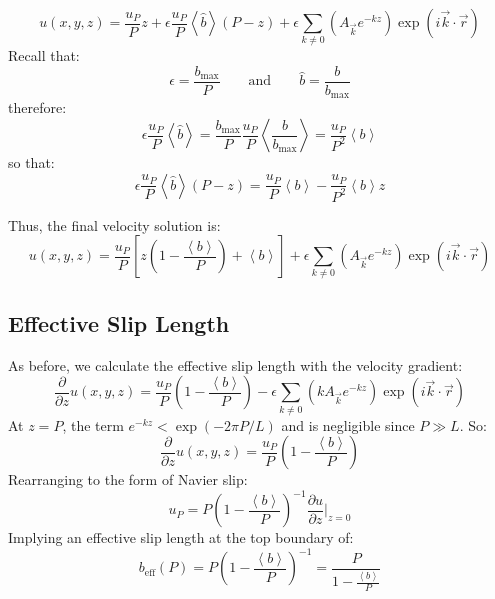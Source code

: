 \documentclass[12pt, a4paper, twoside, openright]{book}
\newcommand{\beff}{\ensuremath{b_{\mathrm{eff}}}}
\newcommand{\bmax}{\ensuremath{b_{\mathrm{max}}}}
\begin{document}
\begin{equation}
u(x,y,z) = \frac{u_P}{P} z
 + \epsilon \frac{u_P}{P} \left< \hat{b} \right> (P - z)
 +  \epsilon \sum_{k \neq 0} 
\left(  A_{\vec{k}} e^{-kz} \right)
\exp(i \vec{k}\cdot \vec{r})
\end{equation}
Recall that:
\begin{equation}
\epsilon = \frac{\bmax}{P} \qquad \text{and} \qquad
\hat{b} = \frac{b}{\bmax}
\end{equation}
therefore:
\begin{equation}
\epsilon \frac{u_P}{P} \left< \hat{b} \right> 
= \frac{\bmax}{P} \frac{u_P }{P} \left< \frac{b}{\bmax} \right> 
= \frac{u_P}{P^2} \left< b \right>
\end{equation}
so that:
\begin{equation}
\epsilon \frac{u_P}{P} \left< \hat{b} \right> (P - z)
= \frac{u_P}{P} \left< b \right> - \frac{u_P}{P^2} \left< b \right> z
\end{equation}


Thus, the final velocity solution is:
\begin{equation}
u(x,y,z) = \frac{u_P}{P} 
\left[ z \left( 1 - \frac{\left< b \right>}{P} \right) + \left< b \right> \right]
 +  \epsilon \sum_{k \neq 0} 
\left(  A_{\vec{k}} e^{-kz} \right)
\exp(i \vec{k}\cdot \vec{r})
\end{equation}



\subsection*{Effective Slip Length}

As before, we calculate the effective slip length with the velocity gradient:
\begin{equation}
\frac{\partial}{\partial z} u(x,y,z) = \frac{u_P}{P} 
\left( 1 - \frac{\left< b \right>}{P} \right)
- \epsilon \sum_{k \neq 0} 
\left( k A_{\vec{k}} e^{-kz} \right)
\exp(i \vec{k}\cdot \vec{r})
\end{equation}
At $z = P$, the term $e^{-kz} < \exp ( - 2 \pi P/L )$ and is negligible since $P \gg L$. So:
\begin{equation}
\frac{\partial}{\partial z} u(x,y,z) = \frac{u_P}{P} 
\left( 1 - \frac{\left< b \right>}{P} \right)
\end{equation}
Rearranging to the form of Navier slip:
\begin{equation}
u_P = P \left( 1 - \frac{\left< b \right>}{P} \right)^{-1}
 \frac{\partial u}{\partial z} \rvert_{z=0}
\end{equation}
Implying an effective slip length at the top boundary of:
\begin{equation}
\beff(P) = P \left( 1 - \frac{\left< b \right>}{P} \right)^{-1} 
= \frac{P}{1 - \frac{\left< b \right>}{P}}
\end{equation}
\end{document}
